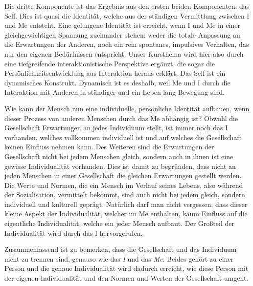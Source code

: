 Die dritte Komponente ist das Ergebnis aus den ersten beiden Komponenten: das Self.
Dies ist quasi die Identität, welche aus der ständigen Vermittlung zwischen I und Me entsteht.
Eine gelungene Identität ist erreicht, wenn I und Me in einer gleichgewichtigen Spannung zueinander stehen: weder die totale Anpassung an die Erwartungen der Anderen, noch ein rein spontanes, impulsives Verhalten, das nur den eigenen Bedürfnissen entspricht.
Unser Kursthema wird hier also durch eine tiefgreifende interaktionistische Perspektive ergänzt, die sogar die Persönlichkeitsentwicklung aus Interaktion heraus erklärt.
Das Self ist ein dynamisches Konstrukt.
Dynamisch ist es deshalb, weil Me und I durch die Interaktion mit Anderen in ständiger und ein Leben lang Bewegung sind.

Wie kann der Mensch nun eine individuelle, persönliche Identität aufbauen, wenn dieser Prozess von anderen Menschen durch das Me abhängig ist?
Obwohl die Gesellschaft Erwartungen an jedes Individuum stellt, ist immer noch das I vorhanden, welches vollkommen individuell ist und auf welches die Gesellschaft keinen Einfluss nehmen kann.
Des Weiteren sind die Erwartungen der Gesellschaft nicht bei jedem Menschen gleich, sondern auch in ihnen ist eine gewisse Individualität vorhanden.
Dies ist damit zu begründen, dass nicht an jeden Menschen in einer Gesellschaft die gleichen Erwartungen gestellt werden.
Die Werte und Normen, die ein Mensch im Verlauf seines Lebens, also während der Sozialisation, vermittelt bekommt, sind auch nicht bei jedem gleich, sondern individuell und kulturell geprägt.
Natürlich darf man nicht vergessen, dass dieser kleine Aspekt der Individualität, welcher im Me enthalten, kaum Einfluss auf die eigentliche Individualität, welche ein jeder Mensch aufbaut.
Der Großteil der Individualität wird durch das I hervorgerufen.

Zusammenfassend ist zu bemerken, dass die Gesellschaft und das Individuum nicht zu trennen sind, genauso wie das \emph{I} und das \emph{Me}.
Beides gehört zu einer Person und die genaue Individualität wird dadurch erreicht, wie diese Person mit der eigenen Individualität und den Normen und Werten der Gesellschaft umgeht.
